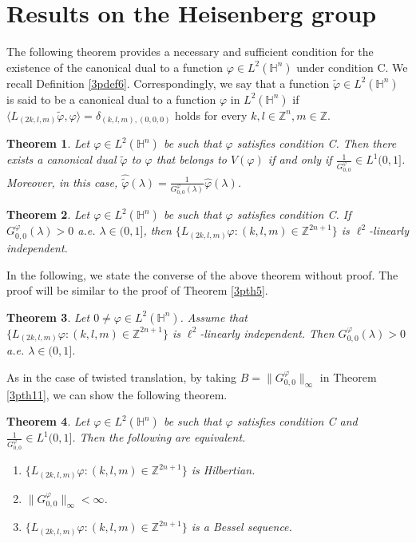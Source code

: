 \documentclass[a4paper,12pt,reqno]{amsart}
\theoremstyle{plain}
\newtheorem{thm}{Theorem}[section]
\numberwithin{equation}{section}
\theoremstyle{definition}
\begin{document}
\section{Results on the Heisenberg group}
The following theorem provides a necessary and sufficient condition for the existence of the canonical dual to a function $\varphi\in L^{2}(\mathbb{H}^{n})$ under condition C. We recall Definition \ref{3pdef6}. Correspondingly, we say that a function $\tilde{\varphi}\in L^{2}(\mathbb{H}^{n})$ is said to be a canonical dual to a function $\varphi$ in $L^{2}(\mathbb{H}^{n})$ if $\langle L_{(2k,l,m)}\tilde{\varphi},\varphi\rangle=\delta_{(k,l,m),(0,0,0)}$ holds for every $k,l\in\mathbb{Z}^{n}, m\in\mathbb{Z}$.
\begin{thm}\label{3pth12}
Let $\varphi\in L^{2}(\mathbb{H}^{n})$ be such that $\varphi$ satisfies condition C. Then there exists a canonical dual $\tilde{\varphi}$ to $\varphi$ that belongs to $V(\varphi)$ if and only if $\frac{1}{G_{0,0}^{\varphi}}\in L^{1}(0,1]$. Moreover, in this case, $\widehat{\tilde{\varphi}}(\lambda)=\frac{1}{G_{0,0}^{\varphi}(\lambda)}
\widehat{\varphi}(\lambda)$.
\end{thm}
\begin{thm}
Let $\varphi\in L^{2}(\mathbb{H}^{n})$ be such that $\varphi$ satisfies condition C. If $G_{0,0}^{\varphi}(\lambda)>0$ a.e. $\lambda\in (0,1]$, then $\{L_{(2k,l,m)}\varphi:(k,l,m)\in\mathbb{Z}^{2n+1}\}$ is $\ell^{2}$-linearly independent.
\end{thm}
In the following, we state the converse of the above theorem without proof. The proof will be similar to the proof of Theorem \ref{3pth5}.
\begin{thm}
Let $0\neq\varphi\in L^{2}(\mathbb{H}^{n})$. Assume that $\{L_{(2k,l,m)}\varphi:(k,l,m)\in\mathbb{Z}^{2n+1}\}$ is $\ell^{2}$-linearly independent. Then $G_{0,0}^{\varphi}(\lambda)>0$ a.e. $\lambda\in (0,1]$.
\end{thm}
As in the case of twisted translation, by taking $B=\|G_{0,0}^{\varphi}\|_{\infty}$ in Theorem \ref{3pth11}, we can show the following theorem.
\begin{thm}
Let $\varphi\in L^{2}(\mathbb{H}^{n})$ be such that $\varphi$ satisfies condition C and $\frac{1}{G_{0,0}^{\varphi}}\in L^{1}(0,1]$. Then the following are equivalent.
\begin{enumerate}
\item [(a)] $\{L_{(2k,l,m)}\varphi:(k,l,m)\in\mathbb{Z}^{2n+1}\}$ is Hilbertian.
\item [(b)] $\|G_{0,0}^{\varphi}\|_{\infty}<\infty$.
\item [(c)] $\{L_{(2k,l,m)}\varphi:(k,l,m)\in\mathbb{Z}^{2n+1}\}$ is a Bessel sequence.
\end{enumerate}
\end{thm}
\end{document}
